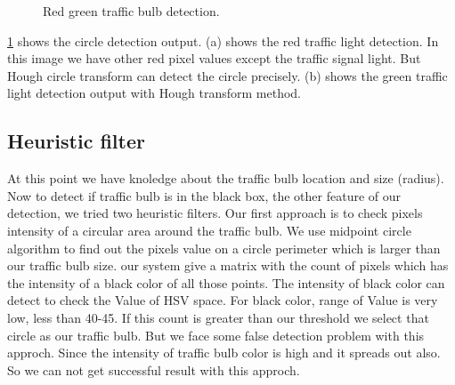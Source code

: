 \begin{figure}[!ht]
\centering
{}

\caption{Red green traffic bulb detection.}
\label{f:cir_img}
\end{figure}

\ref{f:cir_img} shows the circle detection output.
(a) shows the red traffic light detection.
In this image we have other red pixel values except the traffic signal light.
But Hough circle transform can detect the circle precisely.
(b) shows the green traffic light detection output with Hough transform method.

\subsection{Heuristic filter}
At this point we have knoledge about the traffic bulb location and size (radius).
Now to detect if traffic bulb is in the black box, the other feature of our detection, we tried two heuristic filters.
Our first approach is to check pixels intensity of a circular area around the traffic bulb.
We use midpoint circle algorithm to find out the pixels value on a circle perimeter which is larger than our traffic bulb size.
our system give a matrix with the count of pixels which has the intensity of a black color of all those points.
The intensity of black color can detect to check the Value of HSV space.
For black color, range of Value is very low, less than 40-45.
If this count is greater than our threshold we select that circle as our traffic bulb.
But we face some false detection problem with this approch.
Since the intensity of traffic bulb color is high and it spreads out also.
So we can not get successful result with this approch.

